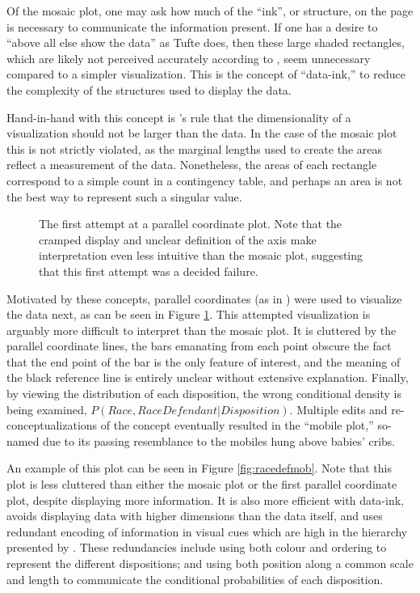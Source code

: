 Of the mosaic plot, one may ask how much of the ``ink'', or structure, on the page is necessary to communicate the information
present. If one has a desire to ``above all else show the data'' as Tufte does, then these large shaded rectangles, which are
likely not perceived accurately according to \citeauthor{cleveland1987}, seem unnecessary compared to a simpler
visualization. This is the concept of ``data-ink,'' to reduce the complexity of the structures used to display the
data.

Hand-in-hand with this concept is \citeauthor{VisualDisplayQuant}'s rule that the dimensionality of a visualization should not be
larger than the data. In the case of the mosaic plot this is not strictly violated, as the marginal lengths used to create the
areas reflect a measurement of the data. Nonetheless, the areas of each rectangle correspond to a simple count in a contingency
table, and perhaps an area is not the best way to represent such a singular value.

\begin{figure}[!h]
  \centering
  \caption[First Parallel Coordinate Attempt]{\footnotesize The first attempt at a parallel coordinate plot. Note that the cramped
    display and unclear definition of the axis make interpretation even less intuitive than the mosaic plot, suggesting that this
    first attempt was a decided failure.}
  \label{fig:firstparcoord}
\end{figure}

Motivated by these concepts, parallel coordinates (as in \cite{wegman1990}) were used to visualize the data next, as can be seen
in Figure \ref{fig:firstparcoord}. This attempted visualization is arguably more difficult to interpret than the mosaic plot. It
is cluttered by the parallel coordinate lines, the bars emanating from each point obscure the fact that the end point of the bar
is the only feature of interest, and the meaning of the black reference line is entirely unclear without extensive
explanation. Finally, by viewing the distribution of each disposition, the wrong conditional density is being examined,
$P(Race,Race Defendant|Disposition)$. Multiple edits and re-conceptualizations of the concept eventually resulted in the ``mobile
plot,'' so-named due to its passing resemblance to the mobiles hung above babies' cribs.

An example of this plot can be seen in Figure \ref{fig:racedefmob}. Note that this plot is less cluttered than either the mosaic plot or
the first parallel coordinate plot, despite displaying more information. It is also more efficient with data-ink, avoids
displaying data with higher dimensions than the data itself, and uses redundant encoding of information in visual cues which are
high in the hierarchy presented by \cite{cleveland1987}. These redundancies include using both colour and ordering to represent
the different dispositions; and using both position along a common scale and length to communicate the conditional probabilities
of each disposition.


